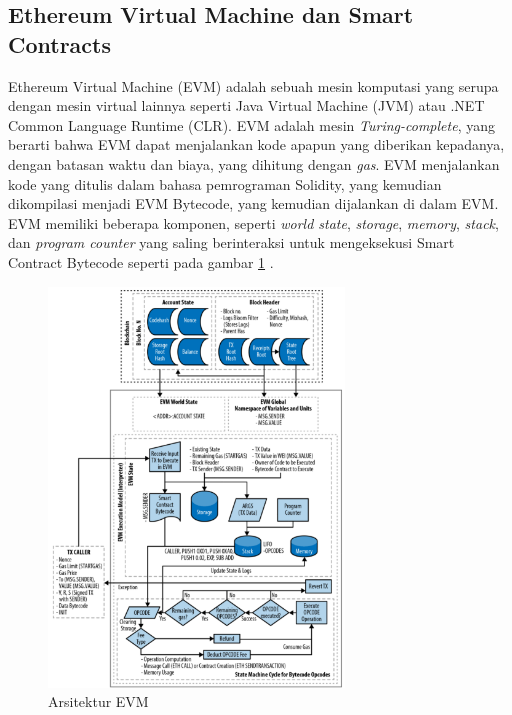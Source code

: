 \subsection{Ethereum Virtual Machine dan Smart Contracts}
\label{subsec:evm-smart-contract}

Ethereum Virtual Machine (EVM) adalah sebuah mesin komputasi yang serupa dengan mesin virtual lainnya seperti Java Virtual Machine (JVM) atau .NET Common Language Runtime (CLR). EVM adalah mesin \textit{Turing-complete}, yang berarti bahwa EVM dapat menjalankan kode apapun yang diberikan kepadanya, dengan batasan waktu dan biaya, yang dihitung dengan \textit{gas}. EVM menjalankan kode yang ditulis dalam bahasa pemrograman Solidity, yang kemudian dikompilasi menjadi EVM Bytecode, yang kemudian dijalankan di dalam EVM. EVM memiliki beberapa komponen, seperti \textit{world state}, \textit{storage}, \textit{memory}, \textit{stack}, dan \textit{program counter} yang saling berinteraksi untuk mengeksekusi Smart Contract Bytecode seperti pada gambar \ref{image:evm-architecture} \parencite{wood2014ethereum}.


\begin{figure}[ht]
	\centering
	\includegraphics[width=0.7\textwidth]{resources/chapter-2/evm-architecture.png}
	\caption{Arsitektur EVM \parencite{antonopoulos2018mastering}}
	\label{image:evm-architecture}
\end{figure}

